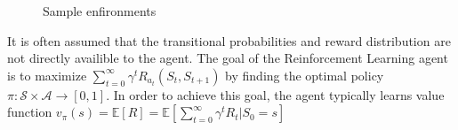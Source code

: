 \documentclass[a0]{a0poster}
\begin{document}
\begin{textblock}{7.0}
\begin{center}
\begin{figure}%
    \centering
    \qquad
    \caption{Sample enfironments}%
    \label{fig:example}%
\end{figure}
\end{center}

It is often assumed that the transitional probabilities and reward distribution
are not directly availible to the agent. The goal of the Reinforcement Learning
agent is to maximize $\sum_{t=0}^{\infty} \gamma^t R_{a_{t}}(S_{t}, S_{t + 1})$
by finding the optimal policy $\pi: \mathcal{S} \times \mathcal{A} \rightarrow
[0, 1]$. In order to achieve this goal, the agent typically learns value
function $v_\pi(s) = \mathbb{E}[R] = {\mathbb{E}}[\sum_{t=0}^\infty \gamma^t
R_t | S_0 = s]$

\end{textblock}
\end{document}
